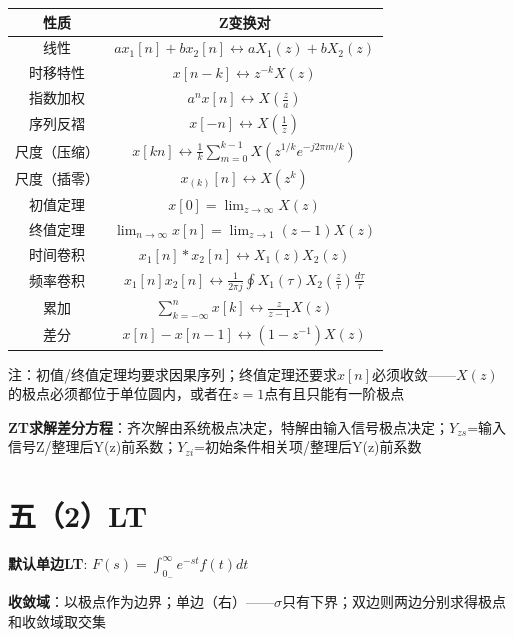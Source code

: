 \begin{center}
\begin{tabular}{|c|c|}
\hline
性质 & Z变换对 \\
\hline
线性 & $a x_{1}[n]+b x_{2}[n] \leftrightarrow a X_{1}(z)+b X_{2}(z)$ \\
\hline
时移特性 & $x[n-k] \leftrightarrow z^{-k} X(z)$ \\
\hline
指数加权 & $a^{n} x[n] \leftrightarrow X\left(\frac{z}{a}\right)$ \\
\hline
序列反褶 & $x[-n] \leftrightarrow X\left(\frac{1}{z}\right)$ \\
\hline
尺度（压缩） & $x[k n] \leftrightarrow \frac{1}{k} \sum_{m=0}^{k-1} X\left(z^{1 / k} e^{-j 2 \pi m / k}\right)$ \\
\hline
尺度（插零） & $x_{(k)}[n] \leftrightarrow X(z^k)$ \\
\hline
初值定理 & $x[0]=\lim _{z \rightarrow \infty} X(z)$ \\
\hline
终值定理 & $\lim _{n \rightarrow \infty} x[n]=\lim _{z \rightarrow 1}(z-1) X(z)$ \\
\hline
时间卷积 & $x_{1}[n] * x_{2}[n] \leftrightarrow X_{1}(z) X_{2}(z)$ \\
\hline
频率卷积 & $x_{1}[n] x_{2}[n] \leftrightarrow \frac{1}{2 \pi j} \oint X_{1}(\tau) X_{2}\left(\frac{z}{\tau}\right) \frac{d \tau}{\tau}$ \\
\hline
累加 & $\sum_{k=-\infty}^{n} x[k] \leftrightarrow \frac{z}{z-1} X(z)$ \\
\hline
差分 & $x[n]-x[n-1] \leftrightarrow\left(1-z^{-1}\right) X(z)$ \\
\hline
\end{tabular}
\end{center}

注：初值/终值定理均要求因果序列；终值定理还要求$x[n]$必须收敛——$X(z)$的极点必须都位于单位圆内，或者在$z=1$点有且只能有一阶极点

\textbf{ZT求解差分方程}：齐次解由系统极点决定，特解由输入信号极点决定；$Y_{zs}$=输入信号Z/整理后Y(z)前系数；$Y_{zi}$=初始条件相关项/整理后Y(z)前系数

\section*{五（2）LT}

\textbf{默认单边LT}:  $F(s)=\int_{0_{-}}^{\infty} e^{-st} f(t) dt$

\textbf{收敛域}：以极点作为边界；单边（右）——$\sigma$只有下界；双边则两边分别求得极点和收敛域取交集

